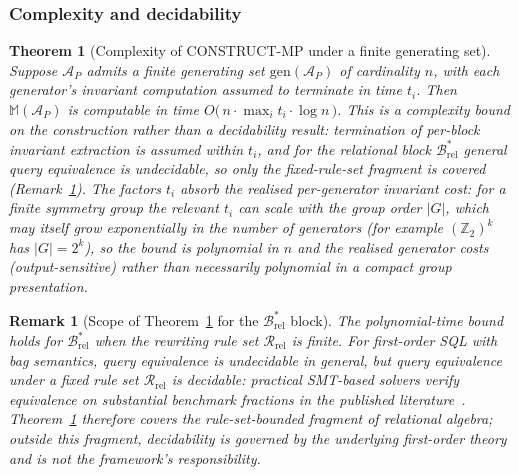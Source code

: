 \documentclass[manuscript]{acmart}
\newtheorem{theorem}{Theorem}
\newtheorem{remark}{Remark}
\begin{document}
\subsubsection{Complexity and decidability}
\label{subsec:decidability}

\begin{theorem}[Complexity of CONSTRUCT-MP under a finite generating set]
\label{thm:decidable}
Suppose $\mathcal{A}_P$ admits a finite generating set $\mathrm{gen}(\mathcal{A}_P)$ of cardinality $n$, with each generator's invariant computation \emph{assumed to terminate} in time $t_i$. Then $\mathbb{M}(\mathcal{A}_P)$ is computable in time $O\!\bigl(\,n \cdot \max_i t_i \cdot \log n\,\bigr)$. This is a complexity bound on the construction rather than a decidability result: termination of per-block invariant extraction is assumed within $t_i$, and for the relational block $\mathcal{B}^{*}_{\mathrm{rel}}$ general query equivalence is undecidable, so only the fixed-rule-set fragment is covered (Remark~\ref{rem:decidable-brel}). The factors $t_i$ absorb the realised per-generator invariant cost: for a finite symmetry group the relevant $t_i$ can scale with the group order $|G|$, which may itself grow exponentially in the number of generators (for example $(\mathbb{Z}_2)^{k}$ has $|G| = 2^{k}$), so the bound is polynomial in $n$ and the realised generator costs (output-sensitive) rather than necessarily polynomial in a compact group presentation.
\end{theorem}

\begin{remark}[Scope of Theorem~\ref{thm:decidable} for the $\mathcal{B}^{*}_{\mathrm{rel}}$ block]
\label{rem:decidable-brel}
The polynomial-time bound holds for $\mathcal{B}^{*}_{\mathrm{rel}}$ when the rewriting rule set $\mathcal{R}_{\mathrm{rel}}$ is finite. For first-order SQL with bag semantics, query equivalence is undecidable in general, but \emph{query equivalence under a fixed rule set $\mathcal{R}_{\mathrm{rel}}$} is decidable: practical SMT-based solvers verify equivalence on substantial benchmark fractions in the published literature~\cite{Wang2024QED, Zhou2022SPES}. Theorem~\ref{thm:decidable} therefore covers the rule-set-bounded fragment of relational algebra; outside this fragment, decidability is governed by the underlying first-order theory and is not the framework's responsibility.
\end{remark}
\end{document}
